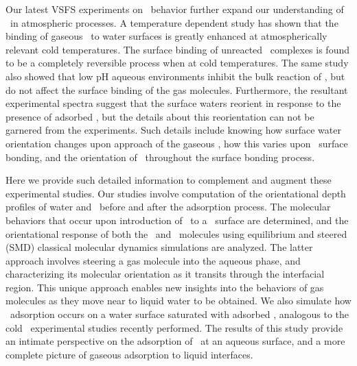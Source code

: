 Our latest VSFS experiments on \suldiox~behavior further expand our understanding of \suldiox~in atmospheric processes.\cite{Ota2011} A temperature dependent study has shown that the binding of gaseous \suldiox~to water surfaces is greatly enhanced at atmospherically relevant cold temperatures. The surface binding of unreacted \suldiox~complexes is found to be a completely reversible process when at cold temperatures. The same study also showed that low pH aqueous environments inhibit the bulk reaction of \suldiox, but do not affect the surface binding of the gas molecules. Furthermore, the resultant experimental spectra suggest that the surface waters reorient in response to the presence of adsorbed \suldiox, but the details about this reorientation can not be garnered from the experiments.  Such details include knowing how surface water orientation changes upon approach of the gaseous \suldiox, how this varies upon \suldiox~surface bonding, and the orientation of \suldiox~throughout the surface bonding process. 

Here we provide such detailed information to complement and augment these experimental studies. Our studies involve computation of the orientational depth profiles of water and \suldiox~before and after the adsorption process. The molecular behaviors that occur upon introduction of \suldiox~to a \wat~surface are determined, and the orientational response of both the \suldiox~and \wat~molecules using equilibrium and steered (SMD) classical molecular dynamics simulations are analyzed. The latter approach involves steering a gas molecule into the aqueous phase, and characterizing its molecular orientation as it transits through the interfacial region.  This unique approach enables new insights into the behaviors of gas molecules as they move near to liquid water to be obtained. We also simulate how \suldiox~adsorption occurs on a water surface saturated with adsorbed \suldiox, analogous to the cold \suldiox~experimental studies recently performed.\cite{Ota2011} The results of this study provide an intimate perspective on the adsorption of \suldiox~at an aqueous surface, and a more complete picture of gaseous adsorption to liquid interfaces.
